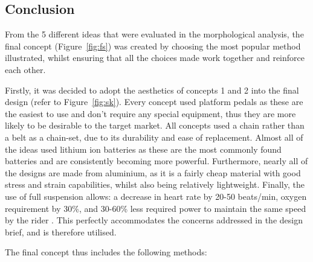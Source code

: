\documentclass[a4paper,11pt]{article}
\begin{document}
\subsection{Conclusion}

From the 5 different ideas that were evaluated in the morphological analysis, the final concept (Figure~\ref{fig:fs}) was created by choosing the most popular method illustrated, whilst ensuring that all the choices made work together and reinforce each other. 

Firstly, it was decided to adopt the aesthetics of concepts 1 and 2 into the final design (refer to Figure~\ref{fig:sk}). Every concept used platform pedals as these are the easiest to use and don't require any special equipment, thus they are more likely to be desirable to the target market. All concepts used a chain rather than a belt as a chain-set, due to its durability and ease of replacement. Almost all of the ideas used lithium ion batteries as these are the most commonly found batteries and are consistently becoming more powerful. Furthermore, nearly all of the designs are made from aluminium, as it is a fairly cheap material with good stress and strain capabilities, whilst also being relatively lightweight. Finally, the use of full suspension allows: a decrease in heart rate by 20-50 beats/min, oxygen requirement by 30\%, and 30-60\% less required power to maintain the same speed by the rider \cite{glaskin12}. This perfectly accommodates the concerns addressed in the design brief, and is therefore utilised.  

The final concept thus includes the following methods:
\end{document}

